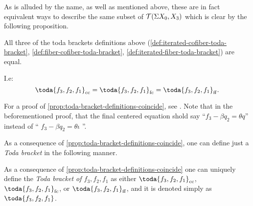 As is alluded by the name, as well as mentioned above, these are in fact equivalent ways to describe the same subset of \( {\mathcal{T}}(\Sigma X_0, X_3) \) which is clear by the following proposition.

\begin{proposition}
    \label{prop:toda-bracket-definitions-coincide}
    All three of the toda brackets definitions above (\autoref{def:iterated-cofiber-toda-bracket}, \autoref{def:fiber-cofiber-toda-bracket}, \autoref{def:iterated-fiber-toda-bracket}) are equal.

    I.e:
    \[
        \toda{f_3, f_2, f_1}_{\cc} = \toda{f_3, f_2, f_1}_{\fc} = \toda{f_3, f_2, f_1}_{\ff}.
    \]
\end{proposition}

For a proof of \autoref{prop:toda-bracket-definitions-coincide}, see \cite[Proposition 3.3]{Christensen-Frankland_2017}. Note that in the beforementioned proof, that the final centered equation shold say ``\( f_3 - \beta q_2 = \theta q \)'' instead of `` \( f_3 - \beta q_2 = \theta \iota \) ''.

As a consequence of \autoref{prop:toda-bracket-definitions-coincide}, one can define just a \emph{Toda bracket} in the following manner.

\begin{definition}
    As a consequence of \autoref{prop:toda-bracket-definitions-coincide} one can uniquely define the \emph{Toda bracket of \( f_3, f_2, f_1 \)} as either \( \toda{f_3, f_2, f_1}_{\cc} \), \( \toda{f_3, f_2, f_1}_{\fc} \), or \( \toda{f_3, f_2, f_1}_{\ff} \), and it is denoted simply as \emph{\( \toda{f_3, f_2, f_1} \)}.
\end{definition}


